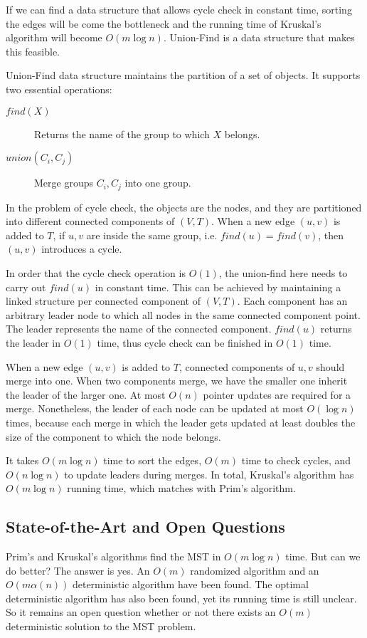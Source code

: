 If we can find a data structure that allows cycle check in constant time, sorting the edges will be come the bottleneck and the running time of Kruskal's algorithm will become $O(m\log n)$. Union-Find is a data structure that makes this feasible.

Union-Find data structure maintains the partition of a set of objects. It supports two essential operations:
\begin{description}
\item[$find(X)$]Returns the name of the group to which $X$ belongs.
\item[$union(C_i, C_j)$]Merge groups $C_i,C_j$ into one group.
\end{description} 
In the problem of cycle check, the objects are the nodes, and they are partitioned into different connected components of $(V,T)$. When a new edge $(u,v)$ is added to $T$, if $u,v$ are inside the same group, i.e. $find(u)=find(v)$, then $(u,v)$ introduces a cycle. 

In order that the cycle check operation is $O(1)$, the union-find here needs to carry out $find(u)$ in constant time. This can be achieved by maintaining a linked structure per connected component of $(V,T)$. Each component has an arbitrary leader node to which all nodes in the same connected component point. The leader represents the name of the connected component. $find(u)$ returns the leader in $O(1)$ time, thus cycle check can be finished in $O(1)$ time. 

When a new edge $(u,v)$ is added to $T$, connected components of $u,v$ should merge into one. When two components merge, we have the smaller one inherit the leader of the larger one. At most $O(n)$ pointer updates are required for a merge. Nonetheless, the leader of each node can be updated at most $O(\log n)$ times, because each merge in which the leader gets updated at least doubles the size of the component to which the node belongs. 

It takes $O(m\log n)$ time to sort the edges, $O(m)$ time to check cycles, and $O(n\log n)$ to update leaders during merges. In total, Kruskal's algorithm has $O(m\log n)$ running time, which matches with Prim's algorithm.
\subsection{State-of-the-Art and Open Questions}
Prim's and Kruskal's algorithms find the MST in $O(m\log n)$ time. But can we do better? The answer is yes. An $O(m)$ randomized algorithm and an $O(m\alpha(n))$ deterministic algorithm have been found. The optimal deterministic algorithm has also been found, yet its running time is still unclear. So it remains an open question whether or not there exists an $O(m)$ deterministic solution to the MST problem.
